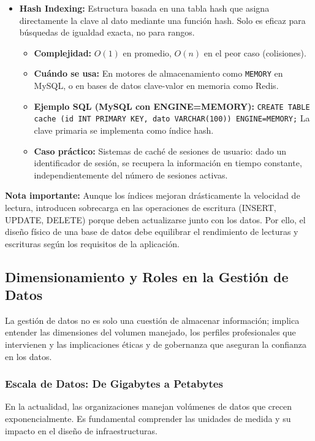 \documentclass[12pt,a4paper,openany,oneside]{book}
\begin{document}
\begin{itemize}
    \item \textbf{Hash Indexing:} Estructura basada en una tabla hash que asigna directamente la clave al dato mediante una función hash. Solo es eficaz para búsquedas de igualdad exacta, no para rangos.
    \begin{itemize}
        \item \textbf{Complejidad:} $O(1)$ en promedio, $O(n)$ en el peor caso (colisiones).
        \item \textbf{Cuándo se usa:} En motores de almacenamiento como \texttt{MEMORY} en MySQL, o en bases de datos clave-valor en memoria como Redis.
        \item \textbf{Ejemplo SQL (MySQL con ENGINE=MEMORY):} \texttt{CREATE TABLE cache (id INT PRIMARY KEY, dato VARCHAR(100)) ENGINE=MEMORY;} La clave primaria se implementa como índice hash.
        \item \textbf{Caso práctico:} Sistemas de caché de sesiones de usuario: dado un identificador de sesión, se recupera la información en tiempo constante, independientemente del número de sesiones activas.
    \end{itemize}
\end{itemize}

\textbf{Nota importante:} Aunque los índices mejoran drásticamente la velocidad de lectura, introducen sobrecarga en las operaciones de escritura (INSERT, UPDATE, DELETE) porque deben actualizarse junto con los datos. Por ello, el diseño físico de una base de datos debe equilibrar el rendimiento de lecturas y escrituras según los requisitos de la aplicación.






\subsection{Dimensionamiento y Roles en la Gestión de Datos}

La gestión de datos no es solo una cuestión de almacenar información; implica entender las dimensiones del volumen manejado, los perfiles profesionales que intervienen y las implicaciones éticas y de gobernanza que aseguran la confianza en los datos.

\subsubsection{Escala de Datos: De Gigabytes a Petabytes}

En la actualidad, las organizaciones manejan volúmenes de datos que crecen exponencialmente. Es fundamental comprender las unidades de medida y su impacto en el diseño de infraestructuras.
\end{document}
